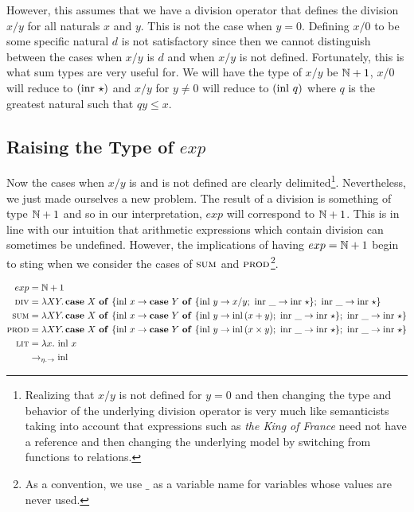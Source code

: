 However, this assumes that we have a division operator that defines the
division $x/y$ for all naturals $x$ and $y$. This is not the case when $y =
0$. Defining $x/0$ to be some specific natural $d$ is not satisfactory
since then we cannot distinguish between the cases when $x/y$ is $d$ and
when $x/y$ is not defined. Fortunately, this is what sum types are very
useful for. We will have the type of $x/y$ be $\mathbb{N} + 1$, $x/0$ will reduce
to $(\operatorname{inr}\,\star)$ and $x/y$ for $y \neq 0$ will reduce to
$(\operatorname{inl}\,q)$ where $q$ is the greatest natural such that $q y \le
x$.

\subsection{Raising the Type of $exp$}
\label{ssec:raising-the-type-of-exp}

Now the cases when $x/y$ is and is not defined are clearly
delimited\footnote{Realizing that $x/y$ is not defined for $y = 0$ and then
  changing the type and behavior of the underlying division operator is
  very much like semanticists taking into account that expressions such as
  \emph{the King of France} need not have a reference and then changing the
  underlying model by switching from functions to
  relations.}. Nevertheless, we just made ourselves a new problem. The
result of a division is something of type $\mathbb{N} + 1$ and so in our
interpretation, $exp$ will correspond to $\mathbb{N} + 1$. This is in line with
our intuition that arithmetic expressions which contain division can
sometimes be undefined. However, the implications of having $exp = \mathbb{N} + 1$
begin to sting when we consider the cases of $\textsc{sum}$ and
$\textsc{prod}$\footnote{As a convention, we use $\_$ as a variable name for
  variables whose values are never used.}.

\begin{align*}
  exp &= \mathbb{N} + 1 \\
  \textsc{div} &= \lambda X Y.\, \text{\textbf{case} $X$ \textbf{of} $\{ \operatorname{inl}\,x \to \text{\textbf{case} $Y$ \textbf{of} $\{ \operatorname{inl}\,y \to x / y;\ \operatorname{inr}\,\_ \to \operatorname{inr}\,\star \}$};\ \operatorname{inr}\,\_ \to \operatorname{inr}\,\star \}$} \\ 
  \textsc{sum} &= \lambda X Y.\, \text{\textbf{case} $X$ \textbf{of} $\{ \operatorname{inl}\,x \to \text{\textbf{case} $Y$ \textbf{of} $\{ \operatorname{inl}\,y \to \operatorname{inl}\,(x + y);\ \operatorname{inr}\,\_ \to \operatorname{inr}\,\star \}$};\ \operatorname{inr}\,\_ \to \operatorname{inr}\,\star \}$} \\ 
  \textsc{prod} &= \lambda X Y.\, \text{\textbf{case} $X$ \textbf{of} $\{ \operatorname{inl}\,x \to \text{\textbf{case} $Y$ \textbf{of} $\{ \operatorname{inl}\,y \to \operatorname{inl}\,(x \times y);\ \operatorname{inr}\,\_ \to \operatorname{inr}\,\star \}$};\ \operatorname{inr}\,\_ \to \operatorname{inr}\,\star \}$} \\ 
  \textsc{lit} &= \lambda x.\, \operatorname{inl}\,x \\
        &\to_{\eta.\to} \operatorname{inl}
\end{align*}


